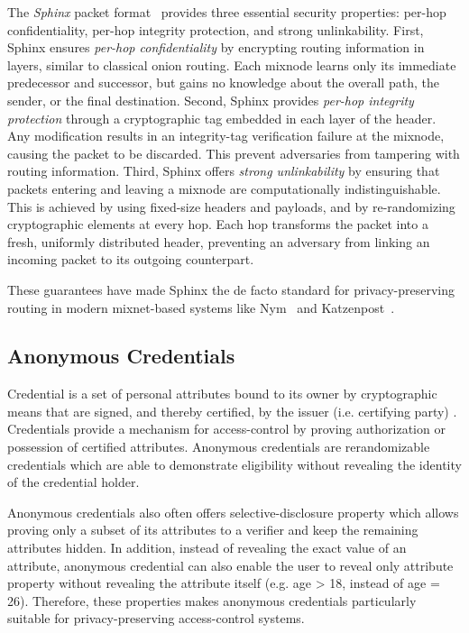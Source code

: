 The \emph{Sphinx} packet format~\cite{sphinx} provides three essential security properties: per-hop confidentiality, per-hop integrity protection, and strong unlinkability. First, Sphinx ensures \emph{per-hop confidentiality} by encrypting routing information in layers, similar to classical onion routing. Each mixnode learns only its immediate predecessor and successor, but gains no knowledge about the overall path, the sender, or the final destination. Second, Sphinx provides \emph{per-hop integrity protection} through a cryptographic tag embedded in each layer of the header. Any modification results in an integrity-tag verification failure at the mixnode, causing the packet to be discarded. This prevent adversaries from tampering with routing information. Third, Sphinx offers \emph{strong unlinkability} by ensuring that packets entering and leaving a mixnode are computationally indistinguishable. This is achieved by using fixed-size headers and payloads, and by re-randomizing cryptographic elements at every hop. Each hop transforms the packet into a fresh, uniformly distributed header, preventing an adversary from linking an incoming packet to its outgoing counterpart.

These guarantees have made Sphinx the de facto standard for privacy-preserving routing in modern mixnet-based systems like Nym~\cite{nym} and Katzenpost~\cite{infeld2025echomix}. %


\subsection{Anonymous Credentials}


Credential is a set of personal attributes bound to its owner by cryptographic means that are signed, and thereby certified, by the issuer (i.e. certifying party) \cite{Fisher_PET}.
Credentials provide a mechanism for access-control by proving authorization or possession of certified attributes.
Anonymous credentials are rerandomizable credentials which are able to demonstrate eligibility without revealing the identity of the credential holder.

Anonymous credentials also often offers selective-disclosure property which allows proving only a subset of its attributes to a verifier and keep the remaining attributes hidden.
In addition, instead of revealing the exact value of an attribute, anonymous credential can also enable the user to reveal only attribute property without revealing the attribute itself (e.g. age > 18, instead of age = 26).
Therefore, these properties makes anonymous credentials particularly suitable for privacy-preserving access-control systems.


